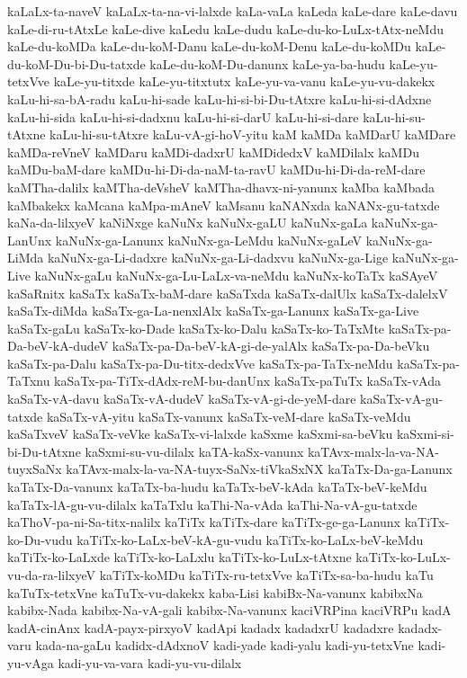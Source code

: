 {kaLaLx-ta-naveV
kaLaLx-ta-na-vi-lalxde
kaLa-vaLa
kaLeda
kaLe-dare
kaLe-davu
kaLe-di-ru-tAtxLe
kaLe-dive
kaLedu
kaLe-dudu
kaLe-du-ko-LuLx-tAtx-neMdu
kaLe-du-koMDa
kaLe-du-koM-Danu
kaLe-du-koM-Denu
kaLe-du-koMDu
kaLe-du-koM-Du-bi-Du-tatxde
kaLe-du-koM-Du-danunx
kaLe-ya-ba-hudu
kaLe-yu-tetxVve
kaLe-yu-titxde
kaLe-yu-titxtutx
kaLe-yu-va-vanu
kaLe-yu-vu-dakekx
kaLu-hi-sa-bA-radu
kaLu-hi-sade
kaLu-hi-si-bi-Du-tAtxre
kaLu-hi-si-dAdxne
kaLu-hi-sida
kaLu-hi-si-dadxnu
kaLu-hi-si-darU
kaLu-hi-si-dare
kaLu-hi-su-tAtxne
kaLu-hi-su-tAtxre
kaLu-vA-gi-hoV-yitu
kaM
kaMDa
kaMDarU
kaMDare
kaMDa-reVneV
kaMDaru
kaMDi-dadxrU
kaMDidedxV
kaMDilalx
kaMDu
kaMDu-baM-dare
kaMDu-hi-Di-da-naM-ta-ravU
kaMDu-hi-Di-da-reM-dare
kaMTha-dalilx
kaMTha-deVsheV
kaMTha-dhavx-ni-yanunx
kaMba
kaMbada
kaMbakekx
kaMcana
kaMpa-mAneV
kaMsanu
kaNANxda
kaNANx-gu-tatxde
kaNa-da-lilxyeV
kaNiNxge
kaNuNx
kaNuNx-gaLU
kaNuNx-gaLa
kaNuNx-ga-LanUnx
kaNuNx-ga-Lanunx
kaNuNx-ga-LeMdu
kaNuNx-gaLeV
kaNuNx-ga-LiMda
kaNuNx-ga-Li-dadxre
kaNuNx-ga-Li-dadxvu
kaNuNx-ga-Lige
kaNuNx-ga-Live
kaNuNx-gaLu
kaNuNx-ga-Lu-LaLx-va-neMdu
kaNuNx-koTaTx
kaSAyeV
kaSaRnitx
kaSaTx
kaSaTx-baM-dare
kaSaTxda
kaSaTx-dalUlx
kaSaTx-dalelxV
kaSaTx-diMda
kaSaTx-ga-La-nenxlAlx
kaSaTx-ga-Lanunx
kaSaTx-ga-Live
kaSaTx-gaLu
kaSaTx-ko-Dade
kaSaTx-ko-Dalu
kaSaTx-ko-TaTxMte
kaSaTx-pa-Da-beV-kA-dudeV
kaSaTx-pa-Da-beV-kA-gi-de-yalAlx
kaSaTx-pa-Da-beVku
kaSaTx-pa-Dalu
kaSaTx-pa-Du-titx-dedxVve
kaSaTx-pa-TaTx-neMdu
kaSaTx-pa-TaTxnu
kaSaTx-pa-TiTx-dAdx-reM-bu-danUnx
kaSaTx-paTuTx
kaSaTx-vAda
kaSaTx-vA-davu
kaSaTx-vA-dudeV
kaSaTx-vA-gi-de-yeM-dare
kaSaTx-vA-gu-tatxde
kaSaTx-vA-yitu
kaSaTx-vanunx
kaSaTx-veM-dare
kaSaTx-veMdu
kaSaTxveV
kaSaTx-veVke
kaSaTx-vi-lalxde
kaSxme
kaSxmi-sa-beVku
kaSxmi-si-bi-Du-tAtxne
kaSxmi-su-vu-dilalx
kaTA-kaSx-vanunx
kaTAvx-malx-la-va-NA-tuyxSaNx
kaTAvx-malx-la-va-NA-tuyx-SaNx-tiVkaSxNX
kaTaTx-Da-ga-Lanunx
kaTaTx-Da-vanunx
kaTaTx-ba-hudu
kaTaTx-beV-kAda
kaTaTx-beV-keMdu
kaTaTx-lA-gu-vu-dilalx
kaTaTxlu
kaThi-Na-vAda
kaThi-Na-vA-gu-tatxde
kaThoV-pa-ni-Sa-titx-nalilx
kaTiTx
kaTiTx-dare
kaTiTx-ge-ga-Lanunx
kaTiTx-ko-Du-vudu
kaTiTx-ko-LaLx-beV-kA-gu-vudu
kaTiTx-ko-LaLx-beV-keMdu
kaTiTx-ko-LaLxde
kaTiTx-ko-LaLxlu
kaTiTx-ko-LuLx-tAtxne
kaTiTx-ko-LuLx-vu-da-ra-lilxyeV
kaTiTx-koMDu
kaTiTx-ru-tetxVve
kaTiTx-sa-ba-hudu
kaTu
kaTuTx-tetxVne
kaTuTx-vu-dakekx
kaba-Lisi
kabiBx-Na-vanunx
kabibxNa
kabibx-Nada
kabibx-Na-vA-gali
kabibx-Na-vanunx
kaciVRPina
kaciVRPu
kadA
kadA-cinAnx
kadA-payx-pirxyoV
kadApi
kadadx
kadadxrU
kadadxre
kadadx-varu
kada-na-gaLu
kadidx-dAdxnoV
kadi-yade
kadi-yalu
kadi-yu-tetxVne
kadi-yu-vAga
kadi-yu-va-vara
kadi-yu-vu-dilalx
}
